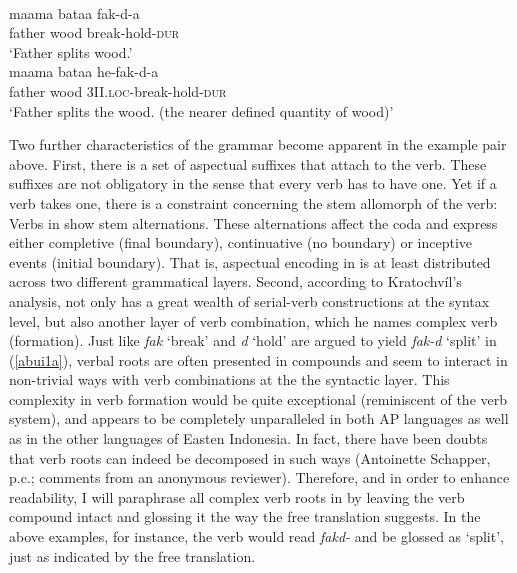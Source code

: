\ea
{}\\
\ea \label{abui1a}
\gll maama bataa fak-d-a \\
father wood break-hold-\textsc{dur} \\
\glft `Father splits wood.’ \\ 
\ex \label{abui1b}
\gll maama bataa he-fak-d-a \\ 
father wood \textsc{3}II.\textsc{loc}-break-hold-\textsc{dur} \\
\glft `Father splits the wood. (the nearer defined quantity of wood)’\\ 
\z
\z

Two further characteristics of the  grammar become apparent in the example pair above. First, there is a set of aspectual suffixes that attach to the verb. These suffixes are not obligatory in the sense that every verb has to have one. Yet if a verb takes one, there is a constraint concerning the stem allomorph of the verb: Verbs in  show stem alternations. These alternations affect the coda and express either completive (final boundary), continuative (no boundary) or inceptive events (initial boundary). That is, aspectual encoding in  is at least distributed across two different grammatical layers. Second, according to Kratochvíl's analysis,  not only has a great wealth of serial-verb constructions at the syntax level, but also another layer of verb combination, which he names complex verb (formation). Just like \textit{fak} `break' and \textit{d} `hold' are argued to yield \textit{fak-d} `split' in (\ref{abui1a}), verbal roots are often presented in compounds and seem to interact in non-trivial ways with verb combinations at the the syntactic layer. This complexity in verb formation would be quite exceptional (reminiscent of the  verb system), and appears to be completely unparalleled in both AP languages as well as in the other languages of Easten Indonesia. In fact, there have been doubts that  verb roots can indeed be decomposed in such ways (Antoinette Schapper, p.c.;  comments from an anonymous reviewer). Therefore, and in order to enhance readability, I will paraphrase all complex verb roots in  by leaving the verb compound intact and glossing it the way the free translation suggests. In the above examples, for instance, the verb would read \textit{fakd-} and be glossed as `split', just as indicated by the free translation.

